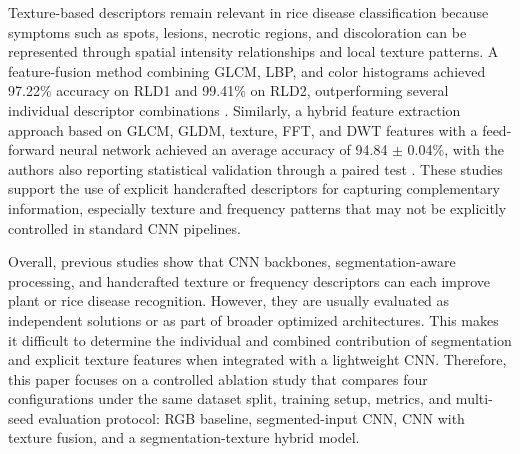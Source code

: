 Texture-based descriptors remain relevant in rice disease classification because symptoms such as spots, lesions, necrotic regions, and discoloration can be represented through spatial intensity relationships and local texture patterns. A feature-fusion method combining GLCM, LBP, and color histograms achieved 97.22\% accuracy on RLD1 and 99.41\% on RLD2, outperforming several individual descriptor combinations \cite{sutikno2026glcm_lbp_color}. Similarly, a hybrid feature extraction approach based on GLCM, GLDM, texture, FFT, and DWT features with a feed-forward neural network achieved an average accuracy of 94.84 $\pm$ 0.04\%, with the authors also reporting statistical validation through a paired test \cite{prity2026ffnn}. These studies support the use of explicit handcrafted descriptors for capturing complementary information, especially texture and frequency patterns that may not be explicitly controlled in standard CNN pipelines.

Overall, previous studies show that CNN backbones, segmentation-aware processing, and handcrafted texture or frequency descriptors can each improve plant or rice disease recognition. However, they are usually evaluated as independent solutions or as part of broader optimized architectures. This makes it difficult to determine the individual and combined contribution of segmentation and explicit texture features when integrated with a lightweight CNN. Therefore, this paper focuses on a controlled ablation study that compares four configurations under the same dataset split, training setup, metrics, and multi-seed evaluation protocol: RGB baseline, segmented-input CNN, CNN with texture fusion, and a segmentation-texture hybrid model.
